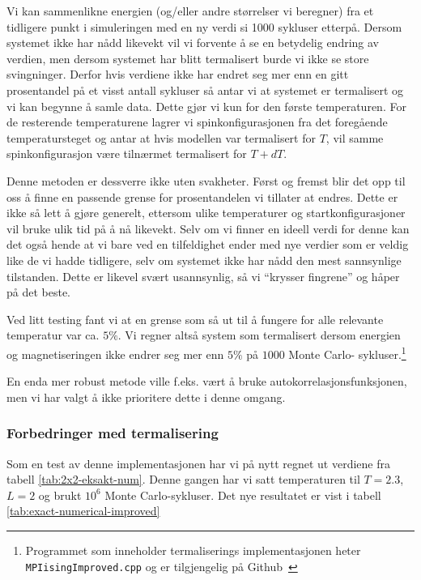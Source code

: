 \documentclass[11pt]{article}
\begin{document}
Vi kan sammenlikne energien (og/eller andre størrelser vi beregner)
fra et tidligere punkt i simuleringen med en ny verdi si 1000 sykluser
etterpå. Dersom systemet ikke har nådd likevekt vil vi forvente å se
en betydelig endring av verdien, men dersom systemet har blitt
termalisert burde vi ikke se store svingninger. Derfor hvis verdiene ikke har endret
seg mer enn en gitt prosentandel på et visst antall sykluser så antar vi at
systemet er termalisert og vi kan begynne å samle data. Dette gjør vi
kun for den første temperaturen. For de resterende temperaturene lagrer
vi spinkonfigurasjonen fra det foregående temperatursteget og antar at hvis
modellen var termalisert for $T$, vil samme spinkonfigurasjon være tilnærmet
termalisert for $T+dT$.

Denne metoden er dessverre ikke uten svakheter. Først og fremst blir
det opp til oss å finne en passende grense for prosentandelen vi
tillater at endres. Dette er ikke så lett å gjøre generelt, ettersom
ulike temperaturer og startkonfigurasjoner vil bruke ulik tid på å nå
likevekt. Selv om vi finner en ideell verdi for denne kan det også hende
at vi bare ved en tilfeldighet ender med nye verdier som er veldig
like de vi hadde tidligere, selv om systemet ikke har nådd den mest
sannsynlige tilstanden. Dette er likevel svært usannsynlig, så vi
``krysser fingrene'' og håper på det beste.

Ved litt testing fant vi at en grense som så ut til å fungere for alle relevante
temperatur var ca. $5\%$. Vi regner altså system som termalisert
dersom energien og magnetiseringen ikke endrer seg mer enn $5\%$ på $1000$ Monte Carlo-
sykluser.\footnote{Programmet som inneholder termaliserings
implementasjonen heter \texttt{MPIisingImproved.cpp} og er
tilgjengelig på Github~\cite{github-repo}}

En enda mer robust metode ville f.eks. vært å bruke autokorrelasjonsfunksjonen,
men vi har valgt å ikke prioritere dette i denne omgang.

\subsubsection{Forbedringer med termalisering}
Som en test av denne implementasjonen har vi på nytt regnet ut
verdiene fra tabell \ref{tab:2x2-eksakt-num}. Denne gangen har vi satt
temperaturen til $T=2.3$, $L=2$ og brukt $10^6$ Monte
Carlo-sykluser. Det nye resultatet er vist i tabell \ref{tab:exact-numerical-improved}
\end{document}

